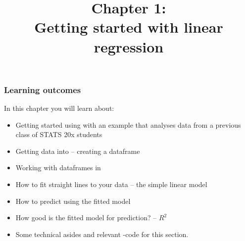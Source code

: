 \documentclass{beamer}\usepackage[]{graphicx}\usepackage[]{xcolor}
\begin{document}
\newcommand{\thechapter}{1}




\title{Chapter 1: \\ Getting started with linear regression}

\begin{frame}
\titlepage
\end{frame}


\begin{frame}[t]
\frametitle{Learning outcomes}
In this chapter you will learn about:
\begin{center}
\vspace{16pt}
\begin{minipage}{.9\textwidth}
\begin{itemize}
  \item Getting started using  with an example that analyses data from a previous class of STATS 20x students
  \item Getting data into  -- creating a dataframe
  \item Working with dataframes in 
  \item How to  fit straight lines to your data --  the simple linear model
  \item How to predict using the fitted model
  \item How good is the fitted model for prediction? --  $R^2$
  \item Some technical asides and relevant -code for this section.
  \end{itemize}
\end{minipage}

\end{center}
\end{frame}


\end{document}
